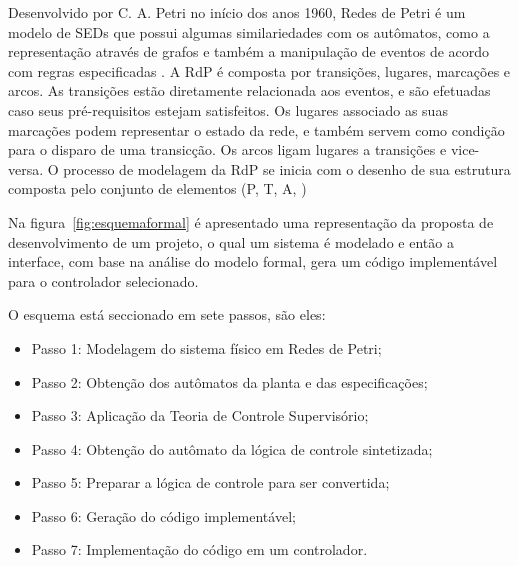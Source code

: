 Desenvolvido por C. A. Petri no in\'icio dos anos 1960, Redes de Petri \'e um modelo de SEDs que possui algumas similariedades com os aut\^omatos, como a representa\c{c}\~ao atrav\'es de grafos e tamb\'em a manipula\c{c}\~ao de eventos de acordo com regras especificadas \cite{Cassandras2008}. A RdP \'e composta por transi\c{c}\~oes, lugares, marca\c{c}\~oes e arcos. As transi\c{c}\~oes est\~ao diretamente relacionada aos eventos, e s\~ao efetuadas caso seus pr\'e-requisitos estejam satisfeitos. Os lugares associado as suas marca\c{c}\~oes podem representar o estado da rede, e tamb\'em servem como condi\c{c}\~ao para o disparo de uma transic\c{c}\~ao. Os arcos ligam lugares a transi\c{c}\~oes e vice-versa.
O processo de modelagem da RdP se inicia com o desenho de sua estrutura composta pelo conjunto de elementos (P, T, A, \omega)

Na figura~\ref{fig:esquemaformal} é apresentado uma representa\c{c}\~ao da proposta de desenvolvimento de um projeto, o qual um sistema \'e modelado e ent\~ao a interface, com base na an\'alise do modelo formal, gera um c\'odigo implement\'avel para o controlador selecionado. 

 O esquema est\'a seccionado em sete passos, s\~ao eles:
 
 \begin{itemize}
 	\item Passo 1: Modelagem do sistema f\'isico em Redes de Petri;
 	\item Passo 2: Obten\c{c}\~ao dos aut\^omatos da planta e das especifica\c{c}\~oes;
 	\item Passo 3: Aplica\c{c}\~ao da Teoria de Controle Supervis\'orio;
 	\item Passo 4: Obten\c{c}\~ao do aut\^omato da l\'ogica de controle sintetizada;
 	\item Passo 5: Preparar a l\'ogica de controle para ser convertida;
 	\item Passo 6: Gera\c{c}\~ao do c\'odigo implement\'avel;
 	\item Passo 7: Implementa\c{c}\~ao do c\'odigo em um controlador.
 \end{itemize}

